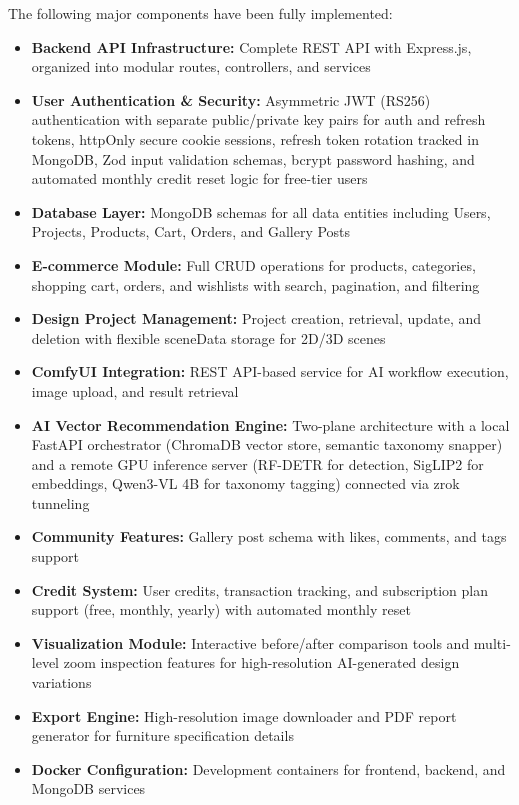 The following major components have been fully implemented:

\begin{itemize}
    \item \textbf{Backend API Infrastructure:} Complete REST API with Express.js, organized into modular routes, controllers, and services
    \item \textbf{User Authentication \& Security:} Asymmetric JWT (RS256) authentication with separate public/private key pairs for auth and refresh tokens, httpOnly secure cookie sessions, refresh token rotation tracked in MongoDB, Zod input validation schemas, bcrypt password hashing, and automated monthly credit reset logic for free-tier users
    \item \textbf{Database Layer:} MongoDB schemas for all data entities including Users, Projects, Products, Cart, Orders, and Gallery Posts
    \item \textbf{E-commerce Module:} Full CRUD operations for products, categories, shopping cart, orders, and wishlists with search, pagination, and filtering
    \item \textbf{Design Project Management:} Project creation, retrieval, update, and deletion with flexible sceneData storage for 2D/3D scenes
    \item \textbf{ComfyUI Integration:} REST API-based service for AI workflow execution, image upload, and result retrieval
    \item \textbf{AI Vector Recommendation Engine:} Two-plane architecture with a local FastAPI orchestrator (ChromaDB vector store, semantic taxonomy snapper) and a remote GPU inference server (RF-DETR for detection, SigLIP2 for embeddings, Qwen3-VL 4B for taxonomy tagging) connected via zrok tunneling
    \item \textbf{Community Features:} Gallery post schema with likes, comments, and tags support
    \item \textbf{Credit System:} User credits, transaction tracking, and subscription plan support (free, monthly, yearly) with automated monthly reset
    \item \textbf{Visualization Module:} Interactive before/after comparison tools and multi-level zoom inspection features for high-resolution AI-generated design variations
    \item \textbf{Export Engine:} High-resolution image downloader and PDF report generator for furniture specification details
    \item \textbf{Docker Configuration:} Development containers for frontend, backend, and MongoDB services
\end{itemize}

